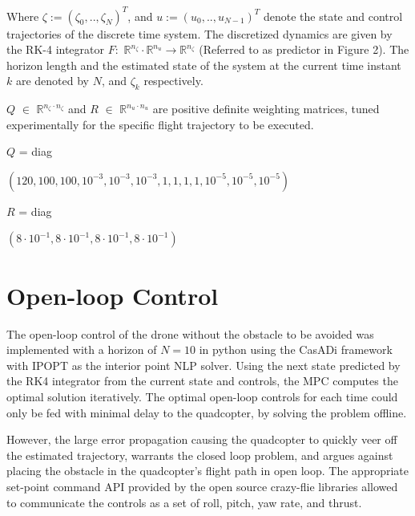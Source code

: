 \documentclass[conference]{IEEEtran}
\begin{document}
Where $\zeta := (\zeta_0, .., \zeta_N)^T$, and $u := (u_0, .., u_{N-1})^T$ denote the state and control trajectories of the discrete time system. The discretized dynamics are given by the RK-4 integrator $F :$ $\mathbb{R}^{n_{\zeta}} \cdot \mathbb{R}^{n_{u}} \rightarrow \mathbb{R}^{n_{\zeta}}$ (Referred to as predictor in Figure 2). The horizon length and the estimated state of the system at the current time instant $k$ are denoted by $N$, and $\zeta_k$ respectively.

 $Q$ $\in$ $\mathbb{R}^{n_{\zeta} \cdot n_{\zeta}}$ and $R$ $\in$ $\mathbb{R}^{n_{u} \cdot n_{u}}$ are positive definite weighting matrices, tuned experimentally for the specific flight trajectory to be executed.
\begin{flushleft}
\begin{small}
$Q$ = diag\begin{footnotesize}$(120, 100, 100, 10^{-3}, 10^{-3},10^{-3},1, 1, 1, 1, 10^{-5}, 10^{-5}, 10^{-5})$\\
\end{footnotesize}
$R$ = diag\begin{footnotesize}$(8 \cdot 10^{-1}, 8\cdot 10^{-1}, 8\cdot 10^{-1}, 8\cdot 10^{-1})$\\
\end{footnotesize}
\end{small}
\end{flushleft}

\section{Open-loop Control }\label{Section4}
The open-loop control of the drone without the obstacle to be avoided was implemented with a horizon of $N = 10$ in python using the CasADi \cite{andersson_casadi_2019} framework with IPOPT \cite{wachter_implementation_2006} as the interior point NLP solver. Using the next state predicted by the RK4 integrator from the current state and controls, the MPC computes the optimal solution iteratively. The optimal open-loop controls for each time could only be fed with minimal delay to the quadcopter, by solving the problem offline. 


However, the large error propagation causing the quadcopter to quickly veer off the estimated trajectory, warrants the closed loop problem, and argues against placing the obstacle in the quadcopter's flight path in open loop.
The appropriate set-point command API provided by the open source crazy-flie libraries allowed to communicate the controls as a set of roll, pitch, yaw rate, and thrust. 
\end{document}
